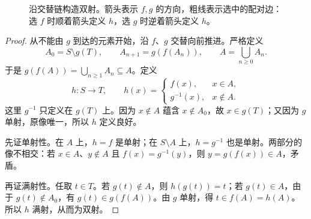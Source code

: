 \documentclass[lang=cn,a4paper,fontset=none,zihao=false,10pt,openany,twoside]{beautybook}
\numberwithin{algorithm}{chapter}
\begin{document}
\begin{figure}[H]
\caption{沿交替链构造双射。箭头表示 $f,g$ 的方向，粗线表示选中的配对边：选 $f$ 时顺着箭头定义 $h$，选 $g$ 时逆着箭头定义 $h$。}
\label{fig:bernstein-chains}
\end{figure}
\begin{proof}
从不能由 $g$ 到达的元素开始，沿 $f$、$g$ 交替向前推进。严格定义
\[
 A_0=S\setminus g(T),\qquad A_{n+1}=g(f(A_n)),\qquad A=\bigcup_{n\geq0}A_n.
\]
于是 $g(f(A))=\bigcup_{n\geq1}A_n\subseteq A$。定义
\[
 h:S\longrightarrow T,\qquad
 h(x)=\begin{cases}f(x),&x\in A,\\g^{-1}(x),&x\notin A.\end{cases}
\]
这里 $g^{-1}$ 只定义在 $g(T)$ 上。因为 $x\notin A$ 蕴含 $x\notin A_0$，故 $x\in g(T)$；又因为 $g$ 单射，原像唯一，所以 $h$ 定义良好。

先证单射性。在 $A$ 上，$h=f$ 是单射；在 $S\setminus A$ 上，$h=g^{-1}$ 也是单射。两部分的像不相交：若 $x\in A$、$y\notin A$ 且 $f(x)=g^{-1}(y)$，则 $y=g(f(x))\in A$，矛盾。

再证满射性。任取 $t\in T$。若 $g(t)\notin A$，则 $h(g(t))=t$；若 $g(t)\in A$，由于 $g(t)\notin A_0$，有 $g(t)\in g(f(A))$。由 $g$ 单射，得 $t\in f(A)=h(A)$。所以 $h$ 满射，从而为双射。
\end{proof}
\end{document}

